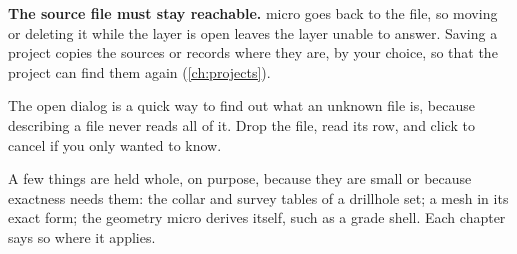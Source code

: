 \textbf{The source file must stay reachable.} micro goes back to the file, so moving or deleting it while the layer is open leaves the layer unable to answer. Saving a project copies the sources or records where they are, by your choice, so that the project can find them again (\cref{ch:projects}).

\begin{tip}
The open dialog is a quick way to find out what an unknown file is, because describing a file never reads all of it. Drop the file, read its row, and click  to cancel if you only wanted to know.
\end{tip}

A few things are held whole, on purpose, because they are small or because exactness needs them: the collar and survey tables of a drillhole set; a mesh in its exact form; the geometry micro derives itself, such as a grade shell. Each chapter says so where it applies.
